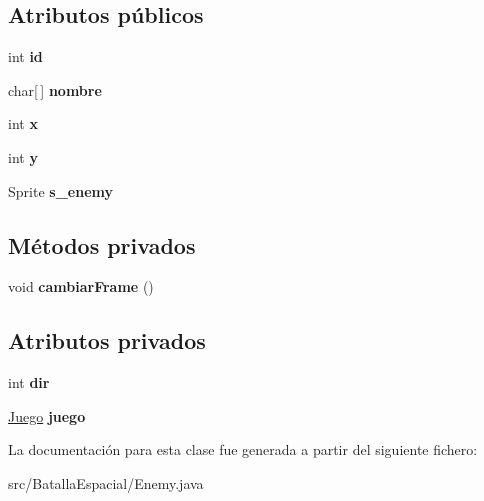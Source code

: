 \subsection*{Atributos públicos}
\begin{DoxyCompactItemize}
\item 
\hypertarget{classBatallaEspacial_1_1Enemy_aedd081ac22ac61cf0ee8e12b640fb143}{
int {\bfseries id}}
\label{classBatallaEspacial_1_1Enemy_aedd081ac22ac61cf0ee8e12b640fb143}

\item 
\hypertarget{classBatallaEspacial_1_1Enemy_ac9266d75c11c9b0e77c3640e2fe9475c}{
char\mbox{[}$\,$\mbox{]} {\bfseries nombre}}
\label{classBatallaEspacial_1_1Enemy_ac9266d75c11c9b0e77c3640e2fe9475c}

\item 
\hypertarget{classBatallaEspacial_1_1Enemy_ab1ec4c829fc566136116fe0f4e8ee51c}{
int {\bfseries x}}
\label{classBatallaEspacial_1_1Enemy_ab1ec4c829fc566136116fe0f4e8ee51c}

\item 
\hypertarget{classBatallaEspacial_1_1Enemy_ab441e983c1f8b6fdf0572d60390aaa1d}{
int {\bfseries y}}
\label{classBatallaEspacial_1_1Enemy_ab441e983c1f8b6fdf0572d60390aaa1d}

\item 
\hypertarget{classBatallaEspacial_1_1Enemy_a39221b0932fd2fcfd58b56c9b3862d35}{
Sprite {\bfseries s\_\-enemy}}
\label{classBatallaEspacial_1_1Enemy_a39221b0932fd2fcfd58b56c9b3862d35}

\end{DoxyCompactItemize}
\subsection*{Métodos privados}
\begin{DoxyCompactItemize}
\item 
\hypertarget{classBatallaEspacial_1_1Enemy_a3cc0d185386b1df605e51a4036f15784}{
void {\bfseries cambiarFrame} ()}
\label{classBatallaEspacial_1_1Enemy_a3cc0d185386b1df605e51a4036f15784}

\end{DoxyCompactItemize}
\subsection*{Atributos privados}
\begin{DoxyCompactItemize}
\item 
\hypertarget{classBatallaEspacial_1_1Enemy_aa6eddfdc0195eb40c34b6150c6127579}{
int {\bfseries dir}}
\label{classBatallaEspacial_1_1Enemy_aa6eddfdc0195eb40c34b6150c6127579}

\item 
\hypertarget{classBatallaEspacial_1_1Enemy_a19945523c0577250c685d6cbed81e2bc}{
\hyperlink{classBatallaEspacial_1_1Juego}{Juego} {\bfseries juego}}
\label{classBatallaEspacial_1_1Enemy_a19945523c0577250c685d6cbed81e2bc}

\end{DoxyCompactItemize}


La documentación para esta clase fue generada a partir del siguiente fichero:\begin{DoxyCompactItemize}
\item 
src/BatallaEspacial/Enemy.java\end{DoxyCompactItemize}
